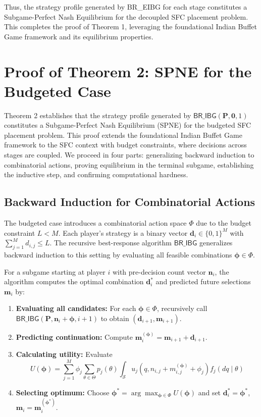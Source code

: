 \documentclass[journal]{IEEEtran}
\theoremstyle{plain}
\theoremstyle{definition}
\theoremstyle{remark}
\begin{document}
Thus, the strategy profile generated by \textsf{BR\_EIBG} for each stage constitutes a Subgame-Perfect Nash Equilibrium for the decoupled SFC placement problem. This completes the proof of Theorem 1, leveraging the foundational Indian Buffet Game framework and its equilibrium properties.


\section{Proof of Theorem 2: SPNE for the Budgeted Case}
\label{app:proof_thm2}

Theorem 2 establishes that the strategy profile generated by $\textsf{BR\_IBG}(\mathbf{P}, \mathbf{0}, 1)$ constitutes a Subgame-Perfect Nash Equilibrium (SPNE) for the budgeted SFC placement problem. This proof extends the foundational Indian Buffet Game framework to the SFC context with budget constraints, where decisions across stages are coupled. We proceed in four parts: generalizing backward induction to combinatorial actions, proving equilibrium in the terminal subgame, establishing the inductive step, and confirming computational hardness.

\subsection{Backward Induction for Combinatorial Actions}
\label{app:proof_thm2_sec1}

The budgeted case introduces a combinatorial action space $\Phi$ due to the budget constraint $L < M$. Each player's strategy is a binary vector $\mathbf{d}_i \in \{0,1\}^M$ with $\sum_{j=1}^M d_{i,j} \leq L$. The recursive best-response algorithm $\textsf{BR\_IBG}$ generalizes backward induction to this setting by evaluating all feasible combinations $\boldsymbol{\phi} \in \Phi$.

For a subgame starting at player $i$ with pre-decision count vector $\mathbf{n}_i$, the algorithm computes the optimal combination $\mathbf{d}_i^*$ and predicted future selections $\mathbf{m}_i$ by:
\begin{enumerate}
    \item \textbf{Evaluating all candidates:} For each $\boldsymbol{\phi} \in \Phi$, recursively call $\textsf{BR\_IBG}(\mathbf{P}, \mathbf{n}_i + \boldsymbol{\phi}, i+1)$ to obtain $(\mathbf{d}_{i+1}, \mathbf{m}_{i+1})$.
    \item \textbf{Predicting continuation:} Compute $\mathbf{m}_i^{(\boldsymbol{\phi})} = \mathbf{m}_{i+1} + \mathbf{d}_{i+1}$.
    \item \textbf{Calculating utility:} Evaluate 
    \begin{equation}
        U(\boldsymbol{\phi}) = \sum_{j=1}^M \phi_j \sum_{\theta \in \Theta} p_j(\theta) \int_{\mathcal{S}} u_j(q, n_{i,j} + m_{i,j}^{(\boldsymbol{\phi})} + \phi_j) f_j(dq \mid \theta)
    \end{equation}
    \item \textbf{Selecting optimum:} Choose $\boldsymbol{\phi}^* = \arg\max_{\boldsymbol{\phi} \in \Phi} U(\boldsymbol{\phi})$ and set $\mathbf{d}_i^* = \boldsymbol{\phi}^*$, $\mathbf{m}_i = \mathbf{m}_i^{(\boldsymbol{\phi}^*)}$.
\end{enumerate}
\end{document}
